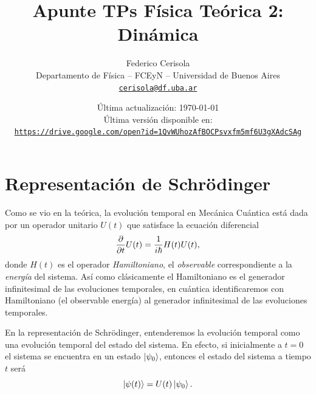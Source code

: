 \documentclass[10pt, a4paper]{article}
\numberwithin{equation}{subsection}
\begin{document}
\title{Apunte TPs Física Teórica 2: Dinámica}
\author{Federico Cerisola
  \\ \small{Departamento de Física -- FCEyN -- Universidad de Buenos Aires}
  \\ \small{\href{mailto:cerisola@df.uba.ar}{\nolinkurl{cerisola@df.uba.ar}}}
}
\date{\small Última actualización: \today \\[1em]
  Última versión disponible en: \\
  \texttt{
    \href{https://drive.google.com/open?id=1QvWUhozAfBOCPsvxfm5mf6U3gXAdcSAg}
    {https://drive.google.com/open?id=1QvWUhozAfBOCPsvxfm5mf6U3gXAdcSAg}
  }}
\maketitle
\thispagestyle{empty}

\vfill
\doclicenseThis

\pagebreak

\newpage
  \tableofcontents
\newpage

\section{Representación de Schrödinger}

Como se vio en la teórica, la evolución temporal en Mecánica Cuántica está dada
por un operador unitario $U(t)$ que satisface la ecuación diferencial
\begin{equation} \label{eq:def_evol_temp_op}
  \pdv{t} U(t) = \frac{1}{i\hbar}H(t)U(t),
\end{equation}
donde $H(t)$ es el operador \emph{Hamiltoniano}, el \emph{observable}
correspondiente a la \emph{energía} del sistema. Así como clásicamente el
Hamiltoniano es el generador infinitesimal de las evoluciones temporales, en
cuántica identificaremos con Hamiltoniano (el observable energía) al generador
infinitesimal de las evoluciones temporales.

En la representación de Schrödinger, entenderemos la evolución temporal como
una evolución temporal del estado del sistema. En efecto, si inicialmente a $t
= 0$ el sistema se encuentra en un estado $\ket{\psi_0}$, entonces el estado
del sistema a tiempo $t$ será
\begin{equation}
  \ket{\psi(t)} = U(t)\ket{\psi_0}.
\end{equation}
\end{document}
